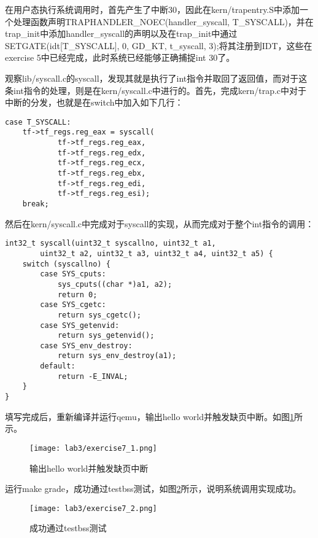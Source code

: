 \begin{exerciseSolution}{7}
    \par 在用户态执行系统调用时，首先产生了中断30，因此在kern/trapentry.S中添加一个处理函数声明TRAPHANDLER\_NOEC(handler\_syscall, T\_SYSCALL)，并在trap\_init中添加handler\_syscall的声明以及在trap\_init中通过SETGATE(idt[T\_SYSCALL], 0, GD\_KT, t\_syscall, 3);将其注册到IDT，这些在exercise 5中已经完成，此时系统已经能够正确捕捉int 30了。
    \par 观察lib/syscall.c的syscall，发现其就是执行了int指令并取回了返回值，而对于这条int指令的处理，则是在kern/syscall.c中进行的。首先，完成kern/trap.c中对于中断的分发，也就是在switch中加入如下几行：
    \begin{lstlisting}
case T_SYSCALL:
    tf->tf_regs.reg_eax = syscall(
            tf->tf_regs.reg_eax,
            tf->tf_regs.reg_edx,
            tf->tf_regs.reg_ecx,
            tf->tf_regs.reg_ebx,
            tf->tf_regs.reg_edi,
            tf->tf_regs.reg_esi);
    break;
    \end{lstlisting}
    \par 然后在kern/syscall.c中完成对于syscall的实现，从而完成对于整个int指令的调用：
    \begin{lstlisting}
int32_t syscall(uint32_t syscallno, uint32_t a1,
        uint32_t a2, uint32_t a3, uint32_t a4, uint32_t a5) {
    switch (syscallno) {
        case SYS_cputs:
            sys_cputs((char *)a1, a2);
            return 0;
        case SYS_cgetc:
            return sys_cgetc();
        case SYS_getenvid:
            return sys_getenvid();
        case SYS_env_destroy:
            return sys_env_destroy(a1);
        default:
            return -E_INVAL;
    }
}
    \end{lstlisting}
    \par 填写完成后，重新编译并运行qemu，输出hello world并触发缺页中断。如图\ref{fig:lab3/exercise7_1}所示。
    \begin{figure}[htb]
        \centering
        \texttt{[image: lab3/exercise7\_1.png]}
        \caption{输出hello world并触发缺页中断}
        \label{fig:lab3/exercise7_1}
    \end{figure}
    \par 运行make grade，成功通过testbss测试，如图\ref{fig:lab3/exercise7_2}所示，说明系统调用实现成功。
    \begin{figure}[htb]
        \centering
        \texttt{[image: lab3/exercise7\_2.png]}
        \caption{成功通过testbss测试}
        \label{fig:lab3/exercise7_2}
    \end{figure}
\end{exerciseSolution}

